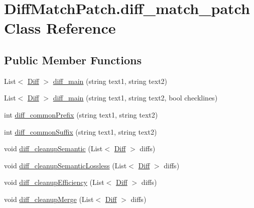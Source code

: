 \hypertarget{class_diff_match_patch_1_1diff__match__patch}{}\section{Diff\+Match\+Patch.\+diff\+\_\+match\+\_\+patch Class Reference}
\label{class_diff_match_patch_1_1diff__match__patch}
\subsection*{Public Member Functions}
\begin{DoxyCompactItemize}
\item 
List$<$ \hyperlink{class_diff_match_patch_1_1_diff}{Diff} $>$ \hyperlink{class_diff_match_patch_1_1diff__match__patch_a9c2159023e88643c43cb347d0bea701c}{diff\+\_\+main} (string text1, string text2)
\item 
List$<$ \hyperlink{class_diff_match_patch_1_1_diff}{Diff} $>$ \hyperlink{class_diff_match_patch_1_1diff__match__patch_ae58cc9b88cca48aac06ff3805c7233f2}{diff\+\_\+main} (string text1, string text2, bool checklines)
\item 
int \hyperlink{class_diff_match_patch_1_1diff__match__patch_ada63eae66f8d9a4fda4686f1749ca0d5}{diff\+\_\+common\+Prefix} (string text1, string text2)
\item 
int \hyperlink{class_diff_match_patch_1_1diff__match__patch_a3bbe3fe977028d955cc1f40ed580a18c}{diff\+\_\+common\+Suffix} (string text1, string text2)
\item 
void \hyperlink{class_diff_match_patch_1_1diff__match__patch_ab93af4e0d066fe13d123e39721a57acc}{diff\+\_\+cleanup\+Semantic} (List$<$ \hyperlink{class_diff_match_patch_1_1_diff}{Diff} $>$ diffs)
\item 
void \hyperlink{class_diff_match_patch_1_1diff__match__patch_a3bd315cbaf640e09ed8c132db12c6af9}{diff\+\_\+cleanup\+Semantic\+Lossless} (List$<$ \hyperlink{class_diff_match_patch_1_1_diff}{Diff} $>$ diffs)
\item 
void \hyperlink{class_diff_match_patch_1_1diff__match__patch_aa8cdfb2a0adaedc640af8b4dc2aba501}{diff\+\_\+cleanup\+Efficiency} (List$<$ \hyperlink{class_diff_match_patch_1_1_diff}{Diff} $>$ diffs)
\item 
void \hyperlink{class_diff_match_patch_1_1diff__match__patch_ae936e42a312995f16e489727e8023070}{diff\+\_\+cleanup\+Merge} (List$<$ \hyperlink{class_diff_match_patch_1_1_diff}{Diff} $>$ diffs)
\item 

\end{DoxyCompactItemize}
